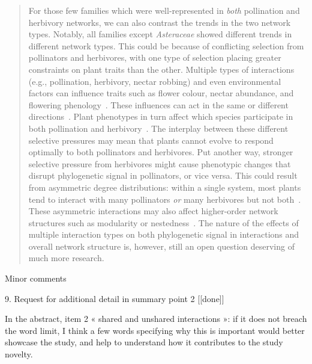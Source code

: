\documentclass[12pt]{letter}
\newenvironment{refquote}{\bigskip \begin{it}}{\end{it}\smallskip}
\begin{document}
		\begin{quotation}

			For those few families which were well-represented in \emph{both} pollination
			and herbivory networks, we can also contrast the 
			trends in the two network types. Notably, all families except \emph{Asteraceae} 
			showed different trends in different network types. 
			This could be because of conflicting selection from pollinators and herbivores,
			with one type of selection placing greater constraints on plant traits than the other.
			Multiple types of interactions (e.g., pollination, herbivory, nectar robbing) 
			and even environmental factors can influence traits such as 
			flower colour, nectar abundance, and flowering phenology~\citep{Strauss2006}. 
			These influences can act in the same or different directions~\citep{Strauss2006}.
			Plant phenotypes in turn affect which species participate in both pollination and herbivory~\citep{Strauss1997,Strauss2002,Adler2004,Adler2006,Theis2006}.
			The interplay between these different selective pressures may mean that plants
			cannot evolve to respond optimally to both pollinators and herbivores. Put another
			way, stronger selective pressure from herbivores might cause phenotypic changes
			that disrupt phylogenetic signal in pollinators, or vice versa. This could result from
			asymmetric degree distributions: within a single system, most plants tend to interact
			with many pollinators \emph{or} many herbivores but not both~\citep{Melian2009,Pocock2012,Astegiano2017}.
			These asymmetric interactions may also affect higher-order network structures such as
			modularity or nestedness~\citep{Astegiano2017}. The nature of the effects of multiple interaction types on both phylogenetic signal in interactions and overall network structure is, however, still an open question deserving of much more research.

		\end{quotation}


	Minor comments

	9. Request for additional detail in summary point 2 [[done]]

		\begin{refquote}
			In the abstract, item 2 « shared and unshared interactions »: if it does not breach the word limit, I think a few words specifying why this is important would better showcase the study, and help to understand how it contributes to the study novelty.
		\end{refquote}
\end{document}
